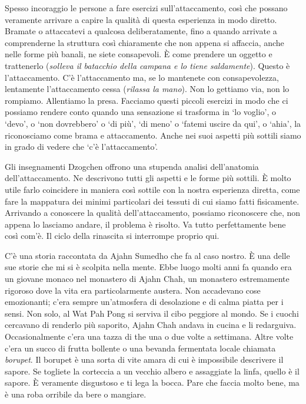 Spesso incoraggio le persone a fare esercizi sull'attaccamento, così che possano veramente arrivare a capire la qualità di questa esperienza in modo diretto. Bramate o attaccatevi a qualcosa deliberatamente, fino a quando arrivate a comprenderne la struttura così chiaramente che non appena si affaccia, anche nelle forme più banali, ne siete consapevoli. È come prendere un oggetto e trattenerlo (\textit{solleva il batacchio della campana e lo tiene saldamente}). Questo è l'attaccamento. C'è l'attaccamento ma, se lo mantenete con consapevolezza, lentamente l'attaccamento cessa (\textit{rilassa la mano}). Non lo gettiamo via, non lo rompiamo. Allentiamo la presa. Facciamo questi piccoli esercizi in modo che ci possiamo rendere conto quando una sensazione si trasforma in `lo voglio', o `devo', o `non dovrebbero' o `di più', `di meno' o `fatemi uscire da qui', o `ahia', la riconosciamo come brama e attaccamento. Anche nei suoi aspetti più sottili siamo in grado di vedere che `c'è l'attaccamento'.

Gli insegnamenti Dzogchen offrono una stupenda analisi dell'anatomia dell'attaccamento. Ne descrivono tutti gli aspetti e le forme più sottili. È molto utile farlo coincidere in maniera così sottile con la nostra esperienza diretta, come fare la mappatura dei minimi particolari dei tessuti di cui siamo fatti fisicamente. Arrivando a conoscere la qualità dell'attaccamento, possiamo riconoscere che, non appena lo lasciamo andare, il problema è risolto. Va tutto perfettamente bene così com'è. Il ciclo della rinascita si interrompe proprio qui.

C'è una storia raccontata da Ajahn Sumedho che fa al caso nostro. È una delle sue storie che mi si è scolpita nella mente. Ebbe luogo molti anni fa quando era un giovane monaco nel monastero di Ajahn Chah, un monastero estremamente rigoroso dove la vita era particolarmente austera. Non accadevano cose emozionanti; c'era sempre un'atmosfera di desolazione e di calma piatta per i sensi. Non solo, al Wat Pah Pong si serviva il cibo peggiore al mondo. Se i cuochi cercavano di renderlo più saporito, Ajahn Chah andava in cucina e li redarguiva. Occasionalmente c'era una tazza di the una o due volte a settimana. Altre volte c'era un succo di frutta bollente o una bevanda fermentata locale chiamata \textit{borupet}. Il borupet è una sorta di vite amara di cui è impossibile descrivere il sapore. Se togliete la corteccia a un vecchio albero e assaggiate la linfa, quello è il sapore. È veramente disgustoso e ti lega la bocca. Pare che faccia molto bene, ma è una roba orribile da bere o mangiare.

